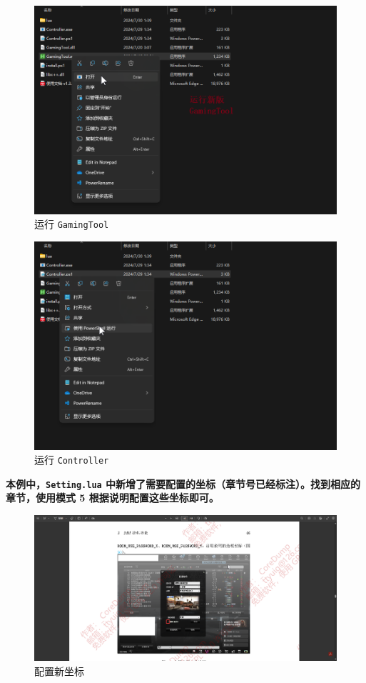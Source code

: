 \begin{figure}[H]
    \Centering
    \includegraphics[width=\textwidth]{docs/assets/update/run_new_gamingtool.png}
    \caption{运行 \lstinline{GamingTool}}
\end{figure}

\begin{figure}[H]
    \Centering
    \includegraphics[width=\textwidth]{docs/assets/update/run_new_controller.png}
    \caption{运行 \lstinline{Controller}}
\end{figure}

\textbf{\color{red} 本例中，\lstinline{Setting.lua} 中新增了需要配置的坐标（章节号已经标注）。找到相应的章节，使用模式 5 根据说明配置这些坐标即可。}

\begin{figure}[H]
    \Centering
    \includegraphics[width=\textwidth]{docs/assets/update/config_new_positions_00.png}
    \caption{配置新坐标}
\end{figure}

